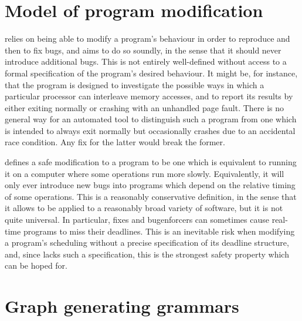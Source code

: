 \section{Model of program modification}
\label{sect:intro:theory_of_fixing}

{\Technique} relies on being able to modify a program's behaviour in
order to reproduce and then to fix bugs, and aims to do so soundly, in
the sense that it should never introduce additional bugs.  This is not
entirely well-defined without access to a formal specification of the
program's desired behaviour.  It might be, for instance, that the
program is designed to investigate the possible ways in which a
particular processor can interleave memory accesses, and to report its
results by either exiting normally or crashing with an unhandled page
fault.  There is no general way for an automated tool to distinguish
such a program from one which is intended to always exit normally but
occasionally crashes due to an accidental race condition.  Any fix for
the latter would break the former.

{\Technique} defines a safe modification to a program to be one which
is equivalent to running it on a computer where some operations run
more slowly.  Equivalently, it will only ever introduce new bugs into
programs which depend on the relative timing of some operations.  This
is a reasonably conservative definition, in the sense that it allows
{\technique} to be applied to a reasonably broad variety of software,
but it is not quite universal.  In particular, {\technique} fixes and
\glspl{bugenforcer} can sometimes cause real-time programs to miss
their deadlines.  This is an inevitable risk when modifying a
program's scheduling without a precise specification of its deadline
structure, and, since {\technique} lacks such a specification, this is
the strongest safety property which can be hoped for.

\section{Graph generating grammars}
\label{sect:intro:graph_grammar}

